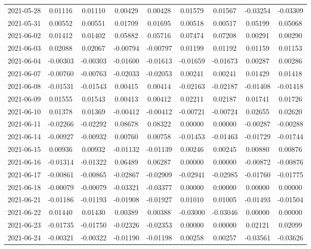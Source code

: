 \begin{footnotesize}
\begin{longtable}{lcccccccc}
2021-05-28 & 0.01116 & 0.01110 & 0.00429 & 0.00428 & 0.01579 & 0.01567 & -0.03254 & -0.03309 \\
2021-05-31 & 0.00552 & 0.00551 & 0.01709 & 0.01695 & 0.00518 & 0.00517 & 0.05199 & 0.05068 \\
2021-06-02 & 0.01412 & 0.01402 & 0.05882 & 0.05716 & 0.07474 & 0.07208 & 0.00291 & 0.00290 \\
2021-06-03 & 0.02088 & 0.02067 & -0.00794 & -0.00797 & 0.01199 & 0.01192 & 0.01159 & 0.01153 \\
2021-06-04 & -0.00303 & -0.00303 & -0.01600 & -0.01613 & -0.01659 & -0.01673 & 0.00287 & 0.00286 \\
2021-06-07 & -0.00760 & -0.00763 & -0.02033 & -0.02053 & 0.00241 & 0.00241 & 0.01429 & 0.01418 \\
2021-06-08 & -0.01531 & -0.01543 & 0.00415 & 0.00414 & -0.02163 & -0.02187 & -0.01408 & -0.01418 \\
2021-06-09 & 0.01555 & 0.01543 & 0.00413 & 0.00412 & 0.02211 & 0.02187 & 0.01741 & 0.01726 \\
2021-06-10 & 0.01378 & 0.01369 & -0.00412 & -0.00412 & -0.00721 & -0.00724 & 0.02655 & 0.02620 \\
2021-06-11 & -0.02266 & -0.02292 & 0.08678 & 0.08322 & 0.00000 & 0.00000 & -0.00287 & -0.00288 \\
2021-06-14 & -0.00927 & -0.00932 & 0.00760 & 0.00758 & -0.01453 & -0.01463 & -0.01729 & -0.01744 \\
2021-06-15 & 0.00936 & 0.00932 & -0.01132 & -0.01139 & 0.00246 & 0.00245 & 0.00880 & 0.00876 \\
2021-06-16 & -0.01314 & -0.01322 & 0.06489 & 0.06287 & 0.00000 & 0.00000 & -0.00872 & -0.00876 \\
2021-06-17 & -0.00861 & -0.00865 & -0.02867 & -0.02909 & -0.02941 & -0.02985 & -0.01760 & -0.01775 \\
2021-06-18 & -0.00079 & -0.00079 & -0.03321 & -0.03377 & 0.00000 & 0.00000 & 0.00000 & 0.00000 \\
2021-06-21 & -0.01186 & -0.01193 & -0.01908 & -0.01927 & 0.01010 & 0.01005 & -0.01493 & -0.01504 \\
2021-06-22 & 0.01440 & 0.01430 & 0.00389 & 0.00388 & -0.03000 & -0.03046 & 0.00000 & 0.00000 \\
2021-06-23 & -0.01735 & -0.01750 & -0.02326 & -0.02353 & 0.00000 & 0.00000 & 0.02121 & 0.02099 \\
2021-06-24 & -0.00321 & -0.00322 & -0.01190 & -0.01198 & 0.00258 & 0.00257 & -0.03561 & -0.03626 \\

\end{longtable}
\end{footnotesize}
